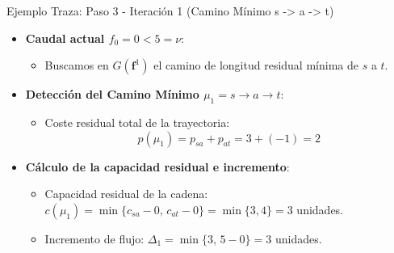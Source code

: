 \documentclass[
  ignorenonframetext,
]{beamer}
\providecommand{\tightlist}{%
  \setlength{\itemsep}{0pt}\setlength{\parskip}{0pt}}
\begin{document}
\begin{frame}{Ejemplo Traza: Paso 3 - Iteración 1 (Camino Mínimo s
-\textgreater{} a -\textgreater{} t)}
\label{ejemplo-traza-paso-3---iteraciuxf3n-1-camino-muxednimo-s---a---t}
\begin{itemize}
\tightlist
\item
  \textbf{Caudal actual \(f_0 = 0 < 5 = \nu\)}:

  \begin{itemize}
  \tightlist
  \item
    Buscamos en \(G(\mathbf{f}^1)\) el camino de longitud residual
    mínima de \(s\) a \(t\).
  \end{itemize}
\item
  \textbf{Detección del Camino Mínimo \(\mu_1 = s \to a \to t\)}:

  \begin{itemize}
  \tightlist
  \item
    Coste residual total de la trayectoria:
    \[p(\mu_1) = p_{sa} + p_{at} = 3 + (-1) = 2\]
  \end{itemize}
\item
  \textbf{Cálculo de la capacidad residual e incremento}:

  \begin{itemize}
  \tightlist
  \item
    Capacidad residual de la cadena:
    \(c(\mu_1) = \min \{c_{sa} - 0, \, c_{at} - 0\} = \min \{3, 4\} = 3\)
    unidades.
  \item
    Incremento de flujo: \(\Delta_1 = \min \{3, \, 5 - 0\} = 3\)
    unidades.
  \end{itemize}
\end{itemize}
\end{frame}
\end{document}
